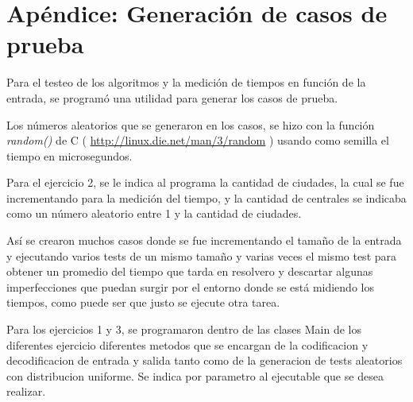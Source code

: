 \section{Ap\'endice: Generaci\'on de casos de prueba} \label{casos_de_prueba}

Para el testeo de los algoritmos y la medici\'on de tiempos en funci\'on de la entrada, se program\'o una utilidad para generar los casos de prueba.

Los n\'umeros aleatorios que se generaron en los casos, se hizo con la funci\'on \emph{random()} de C ( \href{http://linux.die.net/man/3/random}{http://linux.die.net/man/3/random} ) usando como semilla el tiempo en microsegundos.

Para el ejercicio 2, se le indica al programa la cantidad de ciudades, la cual se fue incrementando para la medici\'on del tiempo, y la cantidad de centrales se indicaba como un n\'umero aleatorio entre 1 y la cantidad de ciudades.

As\'i se crearon muchos casos donde se fue incrementando el tama\~no de la entrada y ejecutando varios tests de un mismo tama\~no y varias veces el mismo test para obtener un promedio del tiempo que tarda en resolvero y descartar algunas imperfecciones que puedan surgir por el entorno donde se est\'a midiendo los tiempos, como puede ser que justo se ejecute otra tarea.

Para los ejercicios 1 y 3, se programaron dentro de las clases Main de los diferentes ejercicio diferentes metodos que se encargan de la codificacion y decodificacion de entrada y salida tanto como de la generacion de tests aleatorios con distribucion uniforme. Se indica por parametro al ejecutable que se desea realizar.